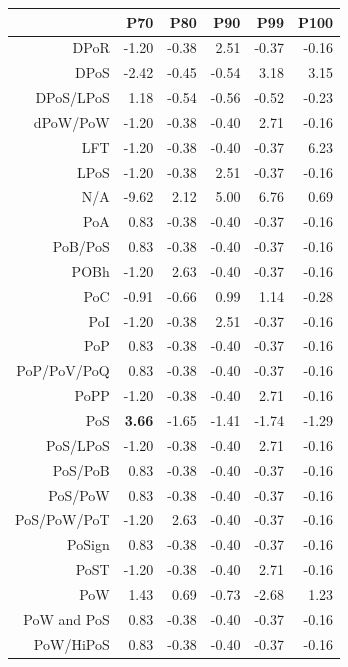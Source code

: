 \documentclass{bmcart}
\begin{document}
\begin{backmatter}
\begin{table}[ht]
	\centering
	\begin{tabular}{rrrrrr}
		\hline
		& P70 & P80 & P90 & P99 & P100 \\ 
		\hline
		DPoR & -1.20 & -0.38 & 2.51 & -0.37 & -0.16 \\ 
		DPoS & -2.42 & -0.45 & -0.54 & 3.18 & 3.15 \\ 
		DPoS/LPoS & 1.18 & -0.54 & -0.56 & -0.52 & -0.23 \\ 
		dPoW/PoW & -1.20 & -0.38 & -0.40 & 2.71 & -0.16 \\ 
		LFT & -1.20 & -0.38 & -0.40 & -0.37 & 6.23 \\ 
		LPoS & -1.20 & -0.38 & 2.51 & -0.37 & -0.16 \\ 
		N/A & -9.62 & 2.12 & 5.00 & 6.76 & 0.69 \\ 
		PoA & 0.83 & -0.38 & -0.40 & -0.37 & -0.16 \\ 
		PoB/PoS & 0.83 & -0.38 & -0.40 & -0.37 & -0.16 \\ 
		POBh & -1.20 & 2.63 & -0.40 & -0.37 & -0.16 \\ 
		PoC & -0.91 & -0.66 & 0.99 & 1.14 & -0.28 \\ 
		PoI & -1.20 & -0.38 & 2.51 & -0.37 & -0.16 \\ 
		PoP & 0.83 & -0.38 & -0.40 & -0.37 & -0.16 \\ 
		PoP/PoV/PoQ & 0.83 & -0.38 & -0.40 & -0.37 & -0.16 \\ 
		PoPP & -1.20 & -0.38 & -0.40 & 2.71 & -0.16 \\ 
		PoS & \textbf{3.66} & -1.65 & -1.41 & -1.74 & -1.29 \\ 
		PoS/LPoS & -1.20 & -0.38 & -0.40 & 2.71 & -0.16 \\ 
		PoS/PoB & 0.83 & -0.38 & -0.40 & -0.37 & -0.16 \\ 
		PoS/PoW & 0.83 & -0.38 & -0.40 & -0.37 & -0.16 \\ 
		PoS/PoW/PoT & -1.20 & 2.63 & -0.40 & -0.37 & -0.16 \\ 
		PoSign & 0.83 & -0.38 & -0.40 & -0.37 & -0.16 \\ 
		PoST & -1.20 & -0.38 & -0.40 & 2.71 & -0.16 \\ 
		PoW & 1.43 & 0.69 & -0.73 & -2.68 & 1.23 \\ 
		PoW and PoS & 0.83 & -0.38 & -0.40 & -0.37 & -0.16 \\ 
		PoW/HiPoS & 0.83 & -0.38 & -0.40 & -0.37 & -0.16 \\ 

\end{tabular}
\end{table}
\end{backmatter}
\end{document}
